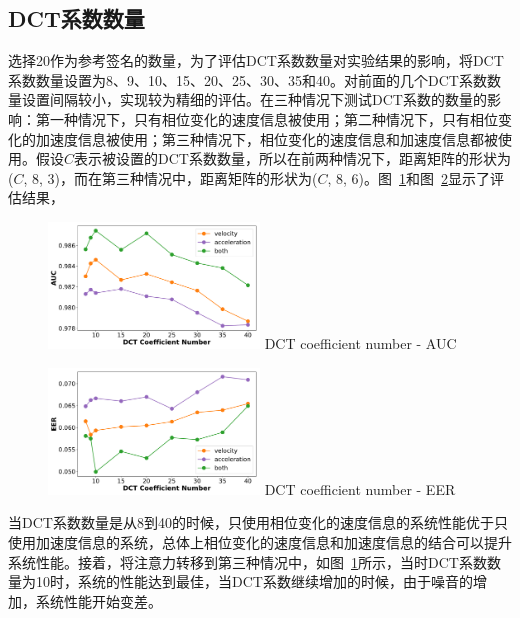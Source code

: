 \subsection{DCT系数数量}
选择20作为参考签名的数量，为了评估DCT系数数量对实验结果的影响，将DCT系数数量设置为8、9、10、15、20、25、30、35和40。对前面的几个DCT系数数量设置间隔较小，实现较为精细的评估。在三种情况下测试DCT系数的数量的影响：第一种情况下，只有相位变化的速度信息被使用；第二种情况下，只有相位变化的加速度信息被使用；第三种情况下，相位变化的速度信息和加速度信息都被使用。假设$C$表示被设置的DCT系数数量，所以在前两种情况下，距离矩阵的形状为($C$, 8, 3)，而在第三种情况中，距离矩阵的形状为($C$, 8, 6)。图~\ref{fig:dct-total-auc}和图~\ref{fig:dct-total-eer}显示了评估结果，
\begin{figure}[!htp]
  \centering
  \includegraphics[width=0.5\textwidth]{figure/dct_total_auc.pdf}
      {DCT coefficient number - AUC}
  \label{fig:dct-total-auc}
\end{figure}
\begin{figure}[!htp]
  \centering
  \includegraphics[width=0.5\textwidth]{figure/dct_total_eer.pdf}
      {DCT coefficient number - EER}
  \label{fig:dct-total-eer}
\end{figure}
当DCT系数数量是从8到40的时候，只使用相位变化的速度信息的系统性能优于只使用加速度信息的系统，总体上相位变化的速度信息和加速度信息的结合可以提升系统性能。接着，将注意力转移到第三种情况中，如图~\ref{fig:dct-total-auc}所示，当时DCT系数数量为10时，系统的性能达到最佳，当DCT系数继续增加的时候，由于噪音的增加，系统性能开始变差。

